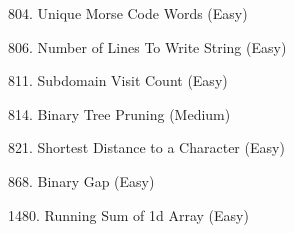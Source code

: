 \begin{flushleft}
804. Unique Morse Code Words (Easy)\hfill\pageref{algo:804}

806. Number of Lines To Write String (Easy)\hfill\pageref{algo:806}

811. Subdomain Visit Count (Easy)\hfill\pageref{algo:811}

814. Binary Tree Pruning (Medium)\hfill\pageref{algo:814}

821. Shortest Distance to a Character (Easy)\hfill\pageref{algo:821}

868. Binary Gap (Easy)\hfill\pageref{algo:868}

1480. Running Sum of 1d Array (Easy)\hfill\pageref{algo:1480}
\end{flushleft}

\newpage
